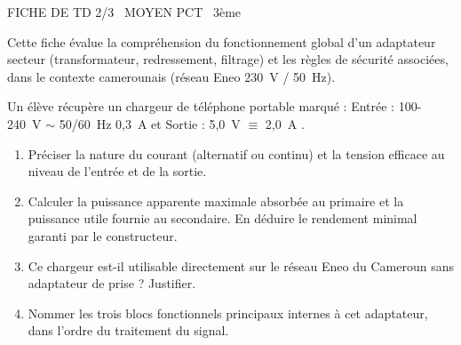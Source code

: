 \documentclass[11pt]{article}
\begin{document}
\begin{tcolorbox}[enhanced,colback=popink,colframe=popink,arc=10pt,boxrule=0pt,left=12pt,right=12pt,top=9pt,bottom=9pt]
{\color{white}\popxbold\small FICHE DE TD 2/3 \textbullet\ MOYEN \hfill PCT \textbullet\ 3ème\par}
\end{tcolorbox}
\vspace{4pt}
Cette fiche évalue la compréhension du fonctionnement global d'un adaptateur secteur (transformateur, redressement, filtrage) et les règles de sécurité associées, dans le contexte camerounais (réseau Eneo 230~V / 50~Hz).

\begin{exercice}
Un élève récupère un chargeur de téléphone portable marqué : \og{} Entrée : 100-240~V $\sim$ 50/60~Hz 0,3~A \fg{} et \og{} Sortie : 5,0~V $\equiv$ 2,0~A \fg{}.
\begin{enumerate}
    \item Préciser la nature du courant (alternatif ou continu) et la tension efficace au niveau de l'entrée et de la sortie.
    \item Calculer la puissance apparente maximale absorbée au primaire et la puissance utile fournie au secondaire. En déduire le rendement minimal garanti par le constructeur.
    \item Ce chargeur est-il utilisable directement sur le réseau Eneo du Cameroun sans adaptateur de prise ? Justifier.
    \item Nommer les trois blocs fonctionnels principaux internes à cet adaptateur, dans l'ordre du traitement du signal.
\end{enumerate}
\end{exercice}
\end{document}
